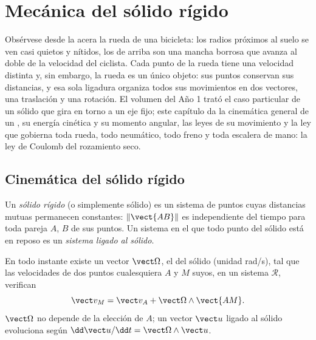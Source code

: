 \chapter{Mecánica del sólido rígido}\label{ch:b2:rigid-body-mechanics}

Obsérvese desde la acera la rueda de una bicicleta: los radios próximos al
suelo se ven casi quietos y nítidos, los de arriba son una mancha borrosa
que avanza al doble de la velocidad del ciclista. Cada punto de la rueda
tiene una velocidad distinta y, sin embargo, la rueda es un único objeto:
sus puntos conservan sus distancias, y esa sola ligadura organiza todos
sus movimientos en dos vectores, una traslación y una rotación. El volumen
del Año 1 trató el caso particular de un sólido que gira en torno a un eje
fijo; este capítulo da la cinemática general de un , su
energía cinética y su momento angular, las leyes de su movimiento y la ley
que gobierna toda rueda, todo neumático, todo freno y toda escalera de
mano: la ley de Coulomb del rozamiento seco.

\section{Cinemática del sólido rígido}

\begin{definition}\label{def:b2:rigid-body-mechanics:solid}
Un \emph{sólido rígido} (o simplemente sólido) es un sistema de puntos
cuyas distancias mutuas permanecen constantes: $\|\vect{AB}\|$ es
independiente del tiempo para toda pareja $A$, $B$ de sus puntos. Un
sistema en el que todo punto del sólido está en reposo es un
\emph{sistema ligado al sólido}.
\end{definition}

\begin{theorem}\label{thm:b2:rigid-body-mechanics:field}
En todo instante existe un vector $\vect\Omega$, el \emph{}
del sólido (unidad \unit{rad/s}), tal que las velocidades de dos puntos
cualesquiera $A$ y $M$ suyos, en un sistema $\mathcal R$, verifican
\[
\vect v_M = \vect v_A + \vect\Omega\wedge\vect{AM} .
\]
$\vect\Omega$ no depende de la elección de $A$; un vector $\vect u$ ligado
al sólido evoluciona según $\dd\vect u/\dd t = \vect\Omega\wedge\vect u$.
\end{theorem}

